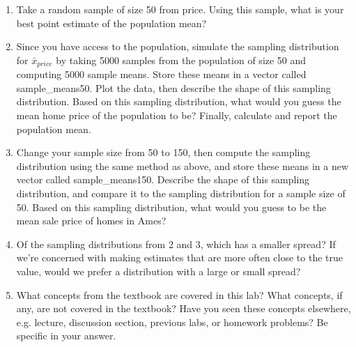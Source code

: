\documentclass{article}\usepackage[]{graphicx}\usepackage[]{color}
\newcommand{\hlstd}[1]{\textcolor[rgb]{0.345,0.345,0.345}{#1}}%
\begin{document}
\begin{enumerate}

\item Take a random sample of size 50 from \hlstd{price}. Using this sample, what is your best point estimate of the population mean?

\item Since you have access to the population, simulate the sampling distribution for $\bar{x}_{price}$ by taking 5000 samples from the population of size 50 and computing 5000 sample means.  Store these means in a vector called \hlstd{sample\_means50}. Plot the data, then describe the shape of this sampling distribution. Based on this sampling distribution, what would you guess the mean home price of the population to be? Finally, calculate and report the population mean.

\item Change your sample size from 50 to 150, then compute the sampling distribution using the same method as above, and store these means in a new vector called \hlstd{sample\_means150}. Describe the shape of this sampling distribution, and compare it to the sampling distribution for a sample size of 50.  Based on this sampling distribution, what would you guess to be the mean sale price of homes in Ames?

\item Of the sampling distributions from 2 and 3, which has a smaller spread?  If we're concerned with making estimates that are more often close to the true value, would we prefer a distribution with a large or small spread?

\item What concepts from the textbook are covered in this lab?  What concepts, if any, are not covered in the textbook?  Have you seen these concepts elsewhere, e.g. lecture, discussion section, previous labs, or homework problems?  Be specific in your answer.

\end{enumerate}
\end{document}

